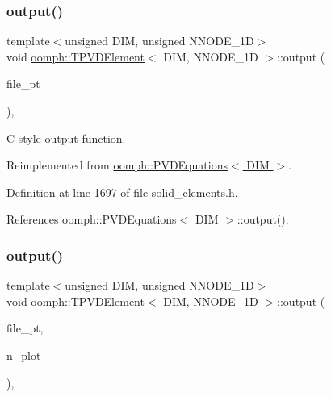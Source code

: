 \subsubsection{\texorpdfstring{output()}{output()}\hspace{0.1cm}{\footnotesize\ttfamily [3/4]}}
{\footnotesize\ttfamily template$<$unsigned D\+IM, unsigned N\+N\+O\+D\+E\+\_\+1D$>$ \\
void \hyperlink{classoomph_1_1TPVDElement}{oomph\+::\+T\+P\+V\+D\+Element}$<$ D\+IM, N\+N\+O\+D\+E\+\_\+1D $>$\+::output (\begin{DoxyParamCaption}\item[{F\+I\+LE $\ast$}]{file\+\_\+pt }\end{DoxyParamCaption})\hspace{0.3cm}{\ttfamily [inline]}, {\ttfamily [virtual]}}



C-\/style output function. 



Reimplemented from \hyperlink{classoomph_1_1PVDEquations_ae5cf4a0254fbb7db5d255db69cfb810e}{oomph\+::\+P\+V\+D\+Equations$<$ D\+I\+M $>$}.



Definition at line 1697 of file solid\+\_\+elements.\+h.



References oomph\+::\+P\+V\+D\+Equations$<$ D\+I\+M $>$\+::output().

\mbox{\label{classoomph_1_1TPVDElement_a439c64bf9eefec5c472dfe91099c2ffd}} 
\subsubsection{\texorpdfstring{output()}{output()}\hspace{0.1cm}{\footnotesize\ttfamily [4/4]}}
{\footnotesize\ttfamily template$<$unsigned D\+IM, unsigned N\+N\+O\+D\+E\+\_\+1D$>$ \\
void \hyperlink{classoomph_1_1TPVDElement}{oomph\+::\+T\+P\+V\+D\+Element}$<$ D\+IM, N\+N\+O\+D\+E\+\_\+1D $>$\+::output (\begin{DoxyParamCaption}\item[{F\+I\+LE $\ast$}]{file\+\_\+pt,  }\item[{const unsigned \&}]{n\+\_\+plot }\end{DoxyParamCaption})\hspace{0.3cm}{\ttfamily [inline]}, {\ttfamily [virtual]}}




